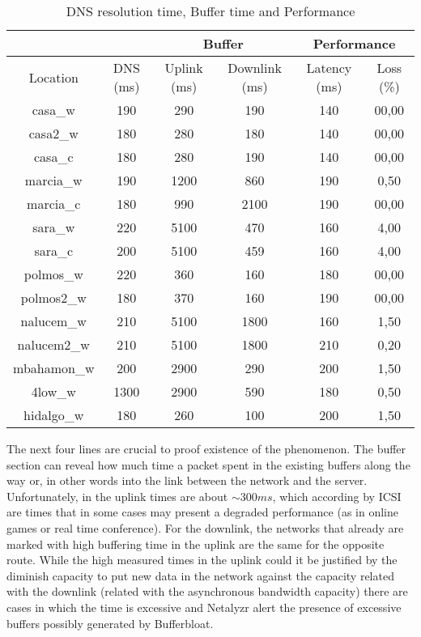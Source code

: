 \begin{table}[ht]
\begin{center}
\begin{tabular}{|c||c||c|c||c|c||}
 \hline
& & \multicolumn{2}{|c||}{Buffer} & \multicolumn{2}{|c||}{Performance} \\ \hline
Location	& DNS (ms) 	& Uplink (ms)	& Downlink (ms) & Latency (ms)	& Loss (\%) \\ \hline \hline
casa\_w		& 190		& 290			& 190 			& 140			& 00,00		\\ \hline
casa2\_w	& 180		& 280			& 180 			& 140			& 00,00		\\ \hline
casa\_c		& 180		& 280			& 190			& 140			& 00,00		\\ \hline
marcia\_w	& 190		& 1200			& 860			& 190			& 0,50 		\\ \hline
marcia\_c	& 180		& 990			& 2100			& 190			& 00,00		\\ \hline
sara\_w		& 220		& 5100			& 470			& 160			& 4,00 		\\ \hline
sara\_c		& 200		& 5100			& 459			& 160			& 4,00 		\\ \hline
polmos\_w	& 220		& 360			& 160			& 180			& 00,00		\\ \hline
polmos2\_w	& 180		& 370			& 160			& 190			& 00,00		\\ \hline
nalucem\_w	& 210		& 5100			& 1800			& 160			& 1,50 		\\ \hline
nalucem2\_w	& 210		& 5100			& 1800			& 210			& 0,20 		\\ \hline
mbahamon\_w	& 200		& 2900			& 290			& 200			& 1,50 		\\ \hline
4low\_w		& 1300		& 2900			& 590			& 180			& 0,50 		\\ \hline
hidalgo\_w	& 180		& 260			& 100			& 200			& 1,50 		\\ \hline
\end{tabular}
\caption[Netalyrz Test:DNS resolution time, Buffer time and Performance]{DNS resolution time, Buffer time and Performance}
\label{table:buffer}
\end{center}
\end{table}

The next four lines are crucial to proof existence of the phenomenon. The
buffer section can reveal how much time a packet spent in the existing buffers
along the way or, in other words into the link between the network and the
server. Unfortunately, in the uplink times are about $\sim300ms$, which
according by ICSI are times that in some cases may present a degraded
performance (as in online games or real time conference). For the downlink,
the networks that already are marked with high buffering time in the uplink
are the same for the opposite route. While the high measured times in the
uplink could it be justified by the diminish capacity to put new data in the
network against the capacity related with the downlink (related with the
asynchronous bandwidth capacity) there are cases in which the time is
excessive and Netalyzr alert the presence of excessive buffers possibly
generated by Bufferbloat.

